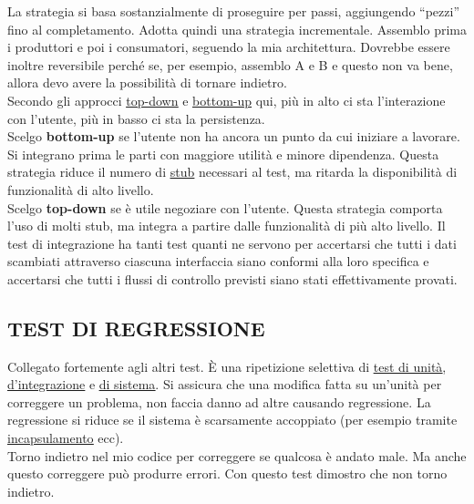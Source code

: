 		La strategia si basa sostanzialmente di proseguire per passi, aggiungendo ``pezzi'' fino al completamento.
		Adotta quindi una strategia incrementale.
		Assemblo prima i produttori e poi i consumatori, seguendo la mia architettura.
		Dovrebbe essere inoltre reversibile perché se, per esempio, assemblo A e B e questo non va bene, allora devo avere la possibilità di tornare indietro. \\
		Secondo gli approcci \underline{\hyperref[topdown]{top-down}} e \underline{\hyperref[bottomup]{bottom-up}} qui, più in alto ci sta l'interazione con l'utente, più in basso ci sta la persistenza. \\
		Scelgo \textbf{bottom-up} se l'utente non ha ancora un punto da cui iniziare a lavorare. Si integrano prima le parti con maggiore utilità e minore dipendenza. Questa strategia riduce il numero di \underline{\hyperref[stub]{stub}} necessari al test, ma ritarda la disponibilità di funzionalità di alto livello. \\
		Scelgo \textbf{top-down} se è utile negoziare con l'utente. Questa strategia comporta l’uso di molti stub, ma integra a partire dalle funzionalità di più alto livello. %
		Il test di integrazione ha tanti test quanti ne servono per accertarsi che tutti i dati scambiati attraverso ciascuna interfaccia siano conformi alla loro specifica e accertarsi che tutti i flussi di controllo previsti siano stati effettivamente provati.


		\subsection{TEST DI REGRESSIONE}		\label{testregressione}
		Collegato fortemente agli altri test.
		È una ripetizione selettiva di \underline{\hyperref[testunita]{test di unità}}, \\
		\underline{\hyperref[testintegrazione]{d'integrazione}} e \underline{\hyperref[testsistema]{ di sistema}}.
		Si assicura che una modifica fatta su un'unità per correggere un problema, non faccia danno ad altre causando regressione.
		La regressione si riduce se il sistema è scarsamente accoppiato (per esempio tramite \underline{\hyperref[incapsulamento]{incapsulamento}} ecc). \\
		Torno indietro nel mio codice per correggere se qualcosa è andato male. Ma anche questo correggere può produrre errori. Con questo test dimostro che non torno indietro.


